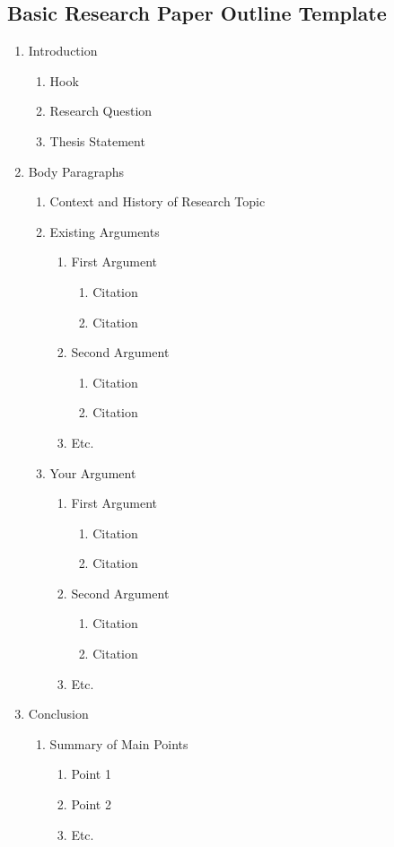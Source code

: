 \documentclass{article}
\begin{document}
\subsection*{Basic Research Paper Outline Template}
\begin{enumerate}
  \item Introduction
  \begin{enumerate}
    \item Hook
    \item Research Question
    \item Thesis Statement
  \end{enumerate}
  \item Body Paragraphs
  \begin{enumerate}
    \item Context and History of Research Topic
    \item Existing Arguments
    \begin{enumerate}
      \item First Argument
      \begin{enumerate}
        \item Citation
        \item Citation
      \end{enumerate}
      \item Second Argument
      \begin{enumerate}
        \item Citation
        \item Citation
      \end{enumerate}
      \item Etc.
    \end{enumerate}
    \item Your Argument
    \begin{enumerate}
      \item First Argument
      \begin{enumerate}
        \item Citation
        \item Citation
      \end{enumerate}
      \item Second Argument
      \begin{enumerate}
        \item Citation
        \item Citation
      \end{enumerate}
      \item Etc.
    \end{enumerate}
  \end{enumerate}
  \item Conclusion
  \begin{enumerate}
    \item Summary of Main Points
    \begin{enumerate}
      \item Point 1
      \item Point 2
      \item Etc.
    \end{enumerate}
  \end{enumerate}
\end{enumerate}
\end{document}
